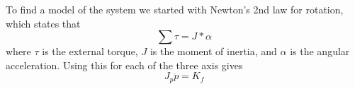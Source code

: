 To find a model of the system we started with Newton's 2nd law for rotation, which states that
\begin{equation} \label{eq:N2rot}
\sum \tau = J*\alpha
\end{equation}
where $\tau$ is the external torque, $J$ is the moment of inertia, and $\alpha$ is the angular acceleration. Using this for each of the three axis gives
\begin{equation} \label{eq:system}
J_p\ddot p = K_f 
\end{equation}